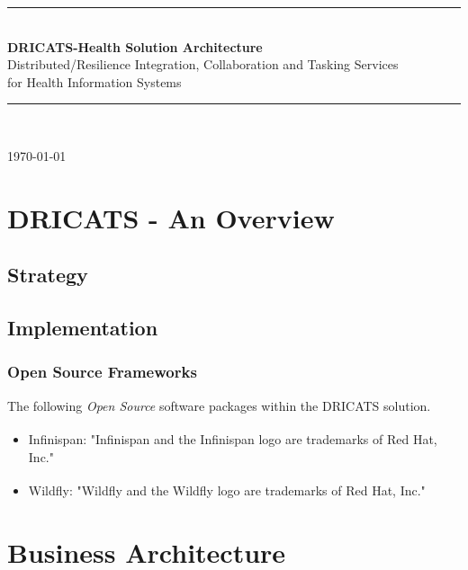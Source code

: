 \documentclass[a4paper]{book}
\newcommand{\HRule}{\rule{0.8\linewidth}{0.5mm}}
\begin{document}
\begin{titlepage}
	\begin{center}


		\HRule \\[0.4cm]
		{ \huge \bfseries DRICATS-Health Solution Architecture\\[0.4cm] }
		Distributed/Resilience Integration, Collaboration and Tasking Services \\
		for Health Information Systems

		\HRule \\[1.5cm]


		\vfill

		{\large \today}

	\end{center}
\end{titlepage}

\tableofcontents

\part{DRICATS - An Overview}

\chapter{Strategy}

\chapter{Implementation}

\section{Open Source Frameworks}

The following \textit{Open Source} software packages within the DRICATS solution.

\begin{itemize}
 \item Infinispan\textsuperscript{\textregistered}:
"Infinispan and the Infinispan logo are trademarks of Red Hat, Inc."
 \item Wildfly\textsuperscript{\textregistered}:
"Wildfly and the Wildfly logo are trademarks of Red Hat, Inc."
\end{itemize}


\part{Business Architecture}
\end{document}
